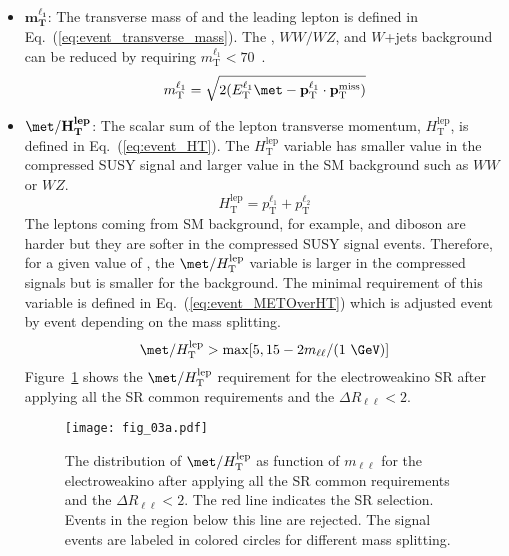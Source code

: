\begin{itemize}
    \item $\mathbf{m_{T}^{\ell_{1}}}$: The transverse mass of \met and the leading lepton is defined in Eq.~(\ref{eq:event_transverse_mass}).
    The \ttbar, $WW/WZ$, and $W$+jets background can be reduced by requiring $m_{\textrm{T}}^{\ell_{1}} < 70$~{\GeV}.
    \begin{equation}
        m_{\textrm{T}}^{\ell_{1}} = \sqrt{2(E_{\textrm{T}}^{\ell_{1}}\met - \mathbf{p}_{\textrm{T}}^{\ell_{1}} \cdot \mathbf{p}_{\textrm{T}}^{\textrm{miss}})}
        \label{eq:event_transverse_mass}
    \end{equation}

    \item $\mathbf{\met/H_{T}^{lep}}$: The scalar sum of the lepton transverse momentum, $H_{\textrm{T}}^{\textrm{lep}}$, is defined  in Eq.~(\ref{eq:event_HT}).
    The $H_{\textrm{T}}^{\textrm{lep}}$ variable has smaller value in the compressed SUSY signal and larger value in the SM background such as $WW$ or $WZ$.
    \begin{equation}
        H_{\textrm{T}}^{\textrm{lep}} = p_{\textrm{T}}^{\ell_{1}} + p_{\textrm{T}}^{\ell_{2}}
        \label{eq:event_HT}
    \end{equation}
    The leptons coming from SM background, for example, \ttbar and diboson are harder but they are softer in the compressed SUSY signal events.
    Therefore, for a given value of \met, the $\met/H_{\textrm{T}}^{\textrm{lep}}$ variable is larger in the compressed signals but is smaller for the background.
    The minimal requirement of this variable is defined in Eq.~(\ref{eq:event_METOverHT}) which is adjusted event by event depending on the mass splitting.
    \begin{equation}
        \met/H_{\textrm{T}}^{\textrm{lep}} > \mathrm{max}[5, 15 - 2 m_{\ell\ell}/(1~{\GeV})]
        \label{eq:event_METOverHT}
    \end{equation}
    Figure~\ref{fig:event_METOverHT} shows the $\met/H_{\textrm{T}}^{\textrm{lep}}$ requirement for the electroweakino SR after applying all the SR common requirements and the $\Delta R_{\ell\ell} < 2$.
    \begin{figure}[htb]
        \begin{center}
            \texttt{[image: fig\_03a.pdf]}
            \caption{The distribution of $\met/H_{\textrm{T}}^{\textrm{lep}}$ as function of $m_{\ell\ell}$ for the electroweakino after applying all the SR common requirements and the $\Delta R_{\ell\ell} < 2$.
            The red line indicates the SR selection.
            Events in the region below this line are rejected.
            The signal events are labeled in colored circles for different mass splitting.}
            \label{fig:event_METOverHT}
        \end{center}
    \end{figure}
\end{itemize}
%

